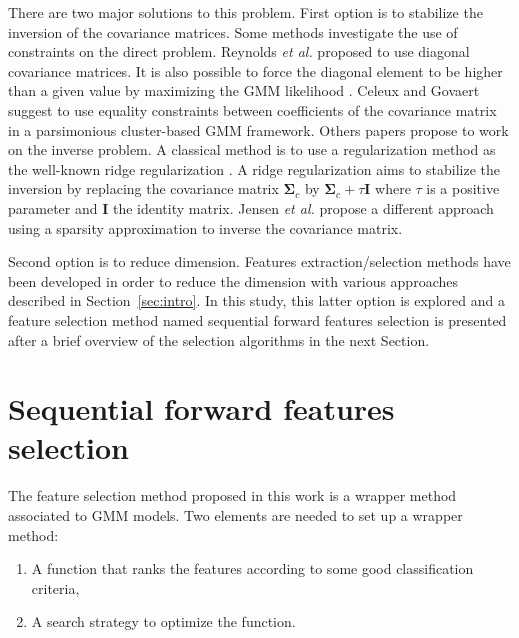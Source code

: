 \documentclass[journal,peerreview,onecolumn]{IEEEtran}
\begin{document}
    There are two major solutions to this problem. First option is to stabilize the inversion of the covariance matrices. Some methods investigate the use of constraints on the direct problem. Reynolds \emph{et al.} \cite{reynolds1995robust} proposed to use diagonal covariance matrices. It is also possible to force the diagonal element to be higher than a given value by maximizing the GMM likelihood \cite{hathaway1985constrained}. Celeux and Govaert \cite{celeux1995gaussian} suggest to use equality constraints between coefficients of the covariance matrix in a parsimonious cluster-based GMM framework. Others papers propose to work on the inverse problem. A classical method is to use a regularization method as the well-known ridge regularization \cite{hoerl1970ridge}. A ridge regularization aims to stabilize the inversion by replacing the covariance matrix $\boldsymbol{\Sigma}_c$ by $\boldsymbol{\Sigma}_c + \tau \mathbf{I}$ where $\tau$ is a positive parameter and $\mathbf{I}$ the identity matrix. Jensen \emph{et al.} \cite{jensen2008regression} propose a different approach using a sparsity approximation to inverse the covariance matrix.

    Second option is to reduce dimension. Features extraction/selection methods have been developed in order to reduce the dimension with various approaches described in Section~\ref{sec:intro}. In this study, this latter option is explored and a feature selection method named sequential forward features selection is presented after a brief overview of the selection algorithms in the next Section.

\section{Sequential forward features selection}
\label{sec:selection}

The feature selection method proposed in this work is a wrapper method associated to GMM models. Two elements are needed to set up a wrapper method:
\begin{enumerate}
\item A function that  ranks the features according to some good classification criteria,
\item A search strategy to optimize the function.
\end{enumerate}
\end{document}
